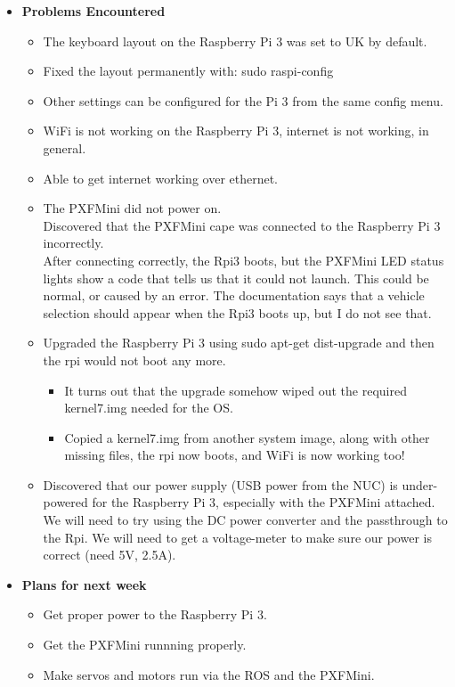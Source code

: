 \documentclass[compsoc,draftclsnofoot,onecolumn,10pt]{IEEEtran}
\begin{document}
\begin{itemize}
    \item {\textbf{Problems Encountered}}
    \begin{itemize}
        \item The keyboard layout on the Raspberry Pi 3 was set to UK by default.
        \item Fixed the layout permanently with: sudo raspi-config
        \item Other settings can be configured for the Pi 3 from the same config menu.
        \item WiFi is not working on the Raspberry Pi 3, internet is not working, in general.
        \item Able to get internet working over ethernet.
        \item The PXFMini did not power on.\\
        Discovered that the PXFMini cape was connected to the Raspberry Pi 3 incorrectly.\\
        After connecting correctly, the Rpi3 boots, but the PXFMini LED status lights show a code that tells us that it could not launch. This could be normal, or caused by an error. The documentation says that a vehicle selection should appear when the Rpi3 boots up, but I do not see that.
        \item Upgraded the Raspberry Pi 3 using sudo apt-get dist-upgrade and then the rpi would not boot any more.
        \begin{itemize}
            \item It turns out that the upgrade somehow wiped out the required kernel7.img needed for the OS.
            \item Copied a kernel7.img from another system image, along with other missing files, the rpi now boots, and WiFi is now working too!
        \end{itemize}
        \item Discovered that our power supply (USB power from the NUC) is under-powered for the Raspberry Pi 3, especially with the PXFMini attached. We will need to try using the DC power converter and the passthrough to the Rpi. We will need to get a voltage-meter to make sure our power is correct (need 5V, 2.5A).
    \end{itemize}

    \item{\textbf{Plans for next week}}
    \begin{itemize}
        \item Get proper power to the Raspberry Pi 3.
        \item Get the PXFMini runnning properly.
        \item Make servos and motors run via the ROS and the PXFMini.
    \end{itemize}
\end{itemize}
\end{document}
